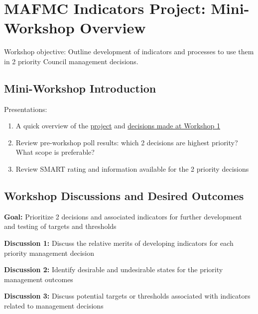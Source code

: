 \documentclass[
]{article}
\author{}
\date{\vspace{-2.5em}}
\begin{document}
\vspace{-1cm}

\section{MAFMC Indicators Project: Mini-Workshop
Overview}\label{mafmc-indicators-project-mini-workshop-overview}

Workshop objective: Outline development of indicators and processes to
use them in 2 priority Council management decisions.

\subsection{Mini-Workshop
Introduction}\label{mini-workshop-introduction}

\begin{noteblock}

Presentations:

\begin{enumerate}
\def\labelenumi{\arabic{enumi}.}
\item
  A quick overview of the
  \href{https://www.mafmc.org/s/Project-5_IRA-Project-Brief.pdf}{project}
  and \href{https://www.mafmc.org/s/WK1_Results-Summary.pdf}{decisions
  made at Workshop 1}
\item
  Review pre-workshop poll results: which 2 decisions are highest
  priority? What scope is preferable?
\item
  Review SMART rating and information available for the 2 priority
  decisions
\end{enumerate}

\end{noteblock}

\begin{ltgreenbox}

\subsection{Workshop Discussions and Desired
Outcomes}\label{workshop-discussions-and-desired-outcomes}

\textbf{Goal:} Prioritize 2 decisions and associated indicators for
further development and testing of targets and thresholds

\textbf{Discussion 1:} Discuss the relative merits of developing
indicators for each priority management decision

\textbf{Discussion 2:} Identify desirable and undesirable states for the
priority management outcomes

\textbf{Discussion 3:} Discuss potential targets or thresholds
associated with indicators related to management decisions

\end{ltgreenbox}
\end{document}
